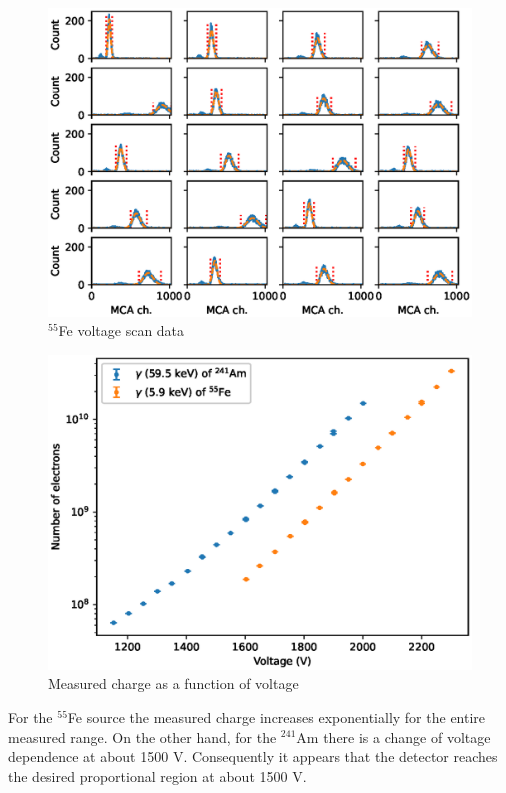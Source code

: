 \documentclass[a4paper]{article}
\begin{document}
\begin{figure}[ht!]
\centering
\includegraphics[width=\textwidth]{fig/python/fe_scan_fits.eps}
\caption{$^{55}$Fe voltage scan data}
\label{fig:fe_scan_fits}
\end{figure}

\begin{figure}[ht!]
\centering
\includegraphics[width=\textwidth]{fig/python/hv_scans.eps}
\caption{Measured charge as a function of voltage}
\label{fig:hv_scans}
\end{figure}

\FloatBarrier
For the $^{55}$Fe source the measured charge increases exponentially for the entire measured range.
On the other hand, for the $^{241}$Am there is a change of voltage dependence at about 1500 V.
Consequently it appears that the detector reaches the desired proportional region at about 1500 V.
\end{document}
